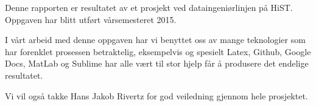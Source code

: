 Denne rapporten er resultatet av et prosjekt ved dataingeniørlinjen på HiST. Oppgaven har blitt utført vårsemesteret 2015. 
\vspace{5mm}


I vårt arbeid med denne oppgaven har vi benyttet oss av mange teknologier som har forenklet prosessen betraktelig, eksempelvis og spesielt Latex, Github, Google Docs, MatLab og Sublime har alle vært til stor hjelp får å produsere det endelige resultatet. 
\vspace{5mm}

Vi vil også takke Hans Jakob Rivertz for god veiledning gjennom hele prosjektet. 
